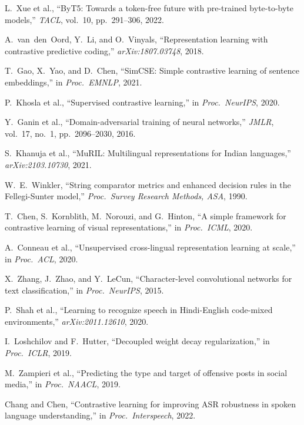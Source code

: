 \documentclass[12pt,a4paper]{report}
\begin{document}
\begin{enumerate}[leftmargin=*, label={[\arabic*]}]
  \item L.~Xue et al., ``ByT5: Towards a token-free future with pre-trained byte-to-byte models,'' \textit{TACL}, vol.~10, pp.~291--306, 2022. \label{ref:xue2022byt5}
  \item A.~van~den~Oord, Y.~Li, and O.~Vinyals, ``Representation learning with contrastive predictive coding,'' \textit{arXiv:1807.03748}, 2018. \label{ref:oord2018representation}
  \item T.~Gao, X.~Yao, and D.~Chen, ``SimCSE: Simple contrastive learning of sentence embeddings,'' in \textit{Proc.\ EMNLP}, 2021. \label{ref:gao2021simcse}
  \item P.~Khosla et al., ``Supervised contrastive learning,'' in \textit{Proc.\ NeurIPS}, 2020.
  \item Y.~Ganin et al., ``Domain-adversarial training of neural networks,'' \textit{JMLR}, vol.~17, no.~1, pp.~2096--2030, 2016. \label{ref:ganin2016domain}
  \item S.~Khanuja et al., ``MuRIL: Multilingual representations for Indian languages,'' \textit{arXiv:2103.10730}, 2021.
  \item W.~E.~Winkler, ``String comparator metrics and enhanced decision rules in the Fellegi-Sunter model,'' \textit{Proc.\ Survey Research Methods, ASA}, 1990.
  \item T.~Chen, S.~Kornblith, M.~Norouzi, and G.~Hinton, ``A simple framework for contrastive learning of visual representations,'' in \textit{Proc.\ ICML}, 2020.
  \item A.~Conneau et al., ``Unsupervised cross-lingual representation learning at scale,'' in \textit{Proc.\ ACL}, 2020.
  \item X.~Zhang, J.~Zhao, and Y.~LeCun, ``Character-level convolutional networks for text classification,'' in \textit{Proc.\ NeurIPS}, 2015.
  \item P.~Shah et al., ``Learning to recognize speech in Hindi-English code-mixed environments,'' \textit{arXiv:2011.12610}, 2020. \label{ref:shah2020learning}
  \item I.~Loshchilov and F.~Hutter, ``Decoupled weight decay regularization,'' in \textit{Proc.\ ICLR}, 2019. \label{ref:loshchilov2019decoupled}
  \item M.~Zampieri et al., ``Predicting the type and target of offensive posts in social media,'' in \textit{Proc.\ NAACL}, 2019.
  \item Chang and Chen, ``Contrastive learning for improving ASR robustness in spoken language understanding,'' in \textit{Proc.\ Interspeech}, 2022.
\end{enumerate}
\end{document}
